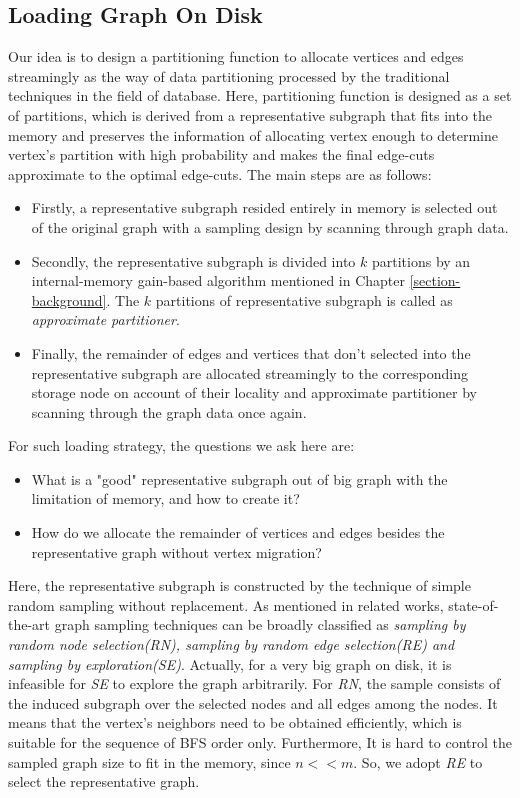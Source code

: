 \documentclass{sig-alternate-2013}
\begin{document}
\subsection{Loading Graph On Disk}

Our idea is to design a partitioning function to allocate vertices and edges streamingly as  the way of data partitioning processed by the traditional techniques in the field of database. Here, partitioning function is designed as a set of partitions, which is derived from a representative subgraph that fits into the memory and preserves the information of allocating vertex enough to determine vertex's partition with high probability and makes the final edge-cuts approximate to the optimal edge-cuts. The main steps are as follows:
\begin{itemize}
\item Firstly, a representative subgraph resided entirely in memory is selected out of the original graph with a sampling design by scanning through graph data.
\item Secondly, the representative subgraph is divided into $k$ partitions by an internal-memory gain-based algorithm mentioned in Chapter \ref{section-background}. The $k$ partitions of representative subgraph is called as \textit{approximate partitioner}.
\item Finally, the remainder of edges and vertices that don't selected into the representative subgraph are allocated streamingly to the corresponding storage node on account of their locality and approximate partitioner by scanning through the graph data once again.
\end{itemize}

For such loading strategy, the questions we ask here are:
\begin{itemize}
\item What is a "good" representative subgraph out of big graph with the limitation of memory, and how to create it?
\item How do we allocate the remainder of vertices and edges besides the representative graph without vertex migration?
\end{itemize}

Here, the representative subgraph is constructed by the technique of simple random sampling without replacement. As mentioned in related works, state-of-the-art graph sampling techniques can be broadly classified as \textit{sampling by random node selection(RN), sampling by random edge selection(RE) and sampling by exploration(SE)}. Actually, for a very big graph on disk, it is infeasible for \textit{SE} to explore the graph arbitrarily. For \textit{RN}, the sample consists of the induced subgraph over the selected nodes and all edges among the nodes. It means that the vertex's neighbors need to be obtained efficiently, which is suitable for the sequence of BFS order only. Furthermore, It is hard to control the sampled graph size to fit in the memory, since $n<<m$. So, we adopt \textit{RE} to select the representative graph.
\end{document}
